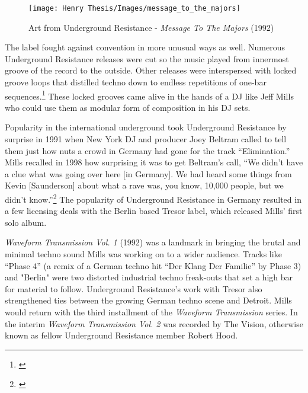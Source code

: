 \documentclass[12pt,twoside]{reedthesis}
\begin{document}
\begin{figure}[htbp]
\begin{centering} 
\texttt{[image: Henry Thesis/Images/message\_to\_the\_majors]}
\caption{Art from Underground Resistance - \emph{Message To The Majors} (1992)}
\label{fig:messagetothemajors}
\end{centering} 
\end{figure}

The label fought against convention in more unusual ways as well. Numerous Underground Resistance releases were cut so the music played from innermost groove of the record to the outside. Other releases were interspersed with locked groove loops that distilled techno down to endless repetitions of one-bar sequences.\footnote{\cite{x-102OBXA1992}} These locked grooves came alive in the hands of a DJ like Jeff Mills who could use them as modular form of composition in his DJ sets.

Popularity in the international underground took Underground Resistance by surprise in 1991 when New York DJ and producer Joey Beltram called to tell them just how nuts a crowd in Germany had gone for the track ``Elimination.'' Mills recalled in 1998 how surprising it was to get Beltram's call, ``We didn't have a clue what was going over here [in Germany]. We had heard some things from Kevin [Saunderson] about what a rave was, you know, 10,000 people, but we didn't know.''\footnote{\cite{schmidtJeffMillsLecture1998a}} The popularity of Underground Resistance in Germany resulted in a few licensing deals with the Berlin based Tresor label, which released Mills' first solo album.

\emph{Waveform Transmission Vol. 1} (1992) was a landmark in bringing the brutal and minimal techno sound Mills was working on to a wider audience. Tracks like ``Phase 4'' (a remix of a German techno hit ``Der Klang Der Familie'' by Phase 3) and "Berlin" were two distorted industrial techno freak-outs that set a high bar for material to follow. Underground Resistance's work with Tresor also strengthened ties between the growing German techno scene and Detroit. Mills would return with the third installment of the \emph{Waveform Transmission} series. In the interim \emph{Waveform Transmission Vol. 2} was recorded by The Vision, otherwise known as fellow Underground Resistance member Robert Hood.
\end{document}
